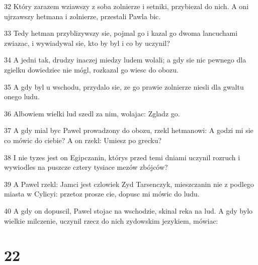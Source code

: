 \par 32 Który zarazem wziawszy z soba zolnierze i setniki, przybiezal do nich. A oni ujrzawszy hetmana i zolnierze, przestali Pawla bic.
\par 33 Tedy hetman przyblizywszy sie, pojmal go i kazal go dwoma lancuchami zwiazac, i wywiadywal sie, kto by byl i co by uczynil?
\par 34 A jedni tak, drudzy inaczej miedzy ludem wolali; a gdy sie nic pewnego dla zgielku dowiedziec nie mógl, rozkazal go wiesc do obozu.
\par 35 A gdy byl u wschodu, przydalo sie, ze go prawie zolnierze niesli dla gwaltu onego ludu.
\par 36 Albowiem wielki lud szedl za nim, wolajac: Zgladz go.
\par 37 A gdy mial byc Pawel prowadzony do obozu, rzekl hetmanowi: A godzi mi sie co mówic do ciebie? A on rzekl: Umiesz po grecku?
\par 38 I nie tyzes jest on Egipczanin, którys przed temi dniami uczynil rozruch i wywiodles na puszcze cztery tysiace mezów zbójców?
\par 39 A Pawel rzekl: Jamci jest czlowiek Zyd Tarsenczyk, mieszczanin nie z podlego miasta w Cylicyi: przetoz prosze cie, dopusc mi mówic do ludu.
\par 40 A gdy on dopuscil, Pawel stojac na wschodzie, skinal reka na lud. A gdy bylo wielkie milczenie, uczynil rzecz do nich zydowskim jezykiem, mówiac:

\chapter{22}

